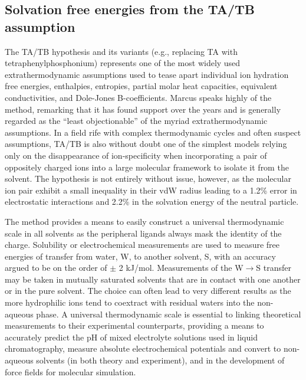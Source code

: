 \begin{tatb}
  \section{\label{ch6:sec1:levelx}Solvation free energies from the TA\sur{+}/TB\sur{-} assumption~}
   The TA\sur{+}/TB\sur{-} hypothesis and its variants (e.g., replacing TA\sur{+} with tetraphenylphosphonium) represents one of the most widely used extrathermodynamic
   assumptions used to tease apart individual ion hydration free energies, enthalpies, entropies, partial molar heat capacities, equivalent conductivities, and Dole-Jones
   B-coefficients\cite{marcus1987tatb}. Marcus speaks highly of the method, remarking that it has found support over the years and is generally regarded as the 
   ``least objectionable'' of the myriad extrathermodynamic assumptions\cite{marcus2015book}. In a field rife with complex thermodynamic cycles and often suspect 
   assumptions, TA\sur{+}/TB\sur{-} is also without doubt one of the simplest models relying only on the disappearance of ion-specificity when incorporating a pair of 
   oppositely charged ions into a large molecular framework to isolate it from the solvent. The hypothesis is not entirely without issue, however, as the molecular ion
   pair exhibit a small inequality in their vdW radius leading to a 1.2\% error in electrostatic interactions and 2.2\% in the solvation energy of the neutral 
   particle\cite{kim1978tatb, marcus2015book}.

   The method provides a means to easily construct a universal thermodynamic scale in all solvents as the peripheral ligands always mask the identity of the charge. 
   Solubility or electrochemical measurements are used to measure free energies of transfer from water, W, to another solvent, S, with an accuracy argued to be on the 
   order of $\pm$ 2 kJ/mol\cite{marcus2015book}. Measurements of the W$\rightarrow$S transfer may be taken in mutually saturated solvents that are in contact with one 
   another or in the pure solvent. The choice can often lead to very different results as the more hydrophilic ions tend to coextract with residual waters into the 
   non-aqueous phase\cite{rose2009, darvas2011, darvas2013}. A universal thermodynamic scale is essential to linking theoretical measurements to their experimental 
   counterparts, providing a means to accurately predict the pH of mixed electrolyte solutions used in liquid chromatography\cite{suu2015mixedpH}, measure absolute 
   electrochemical potentials and convert to non-aqueous solvents (in both theory and experiment)\cite{isse2010univscale}, and in the development of force fields for 
   molecular simulation.


\end{tatb}
